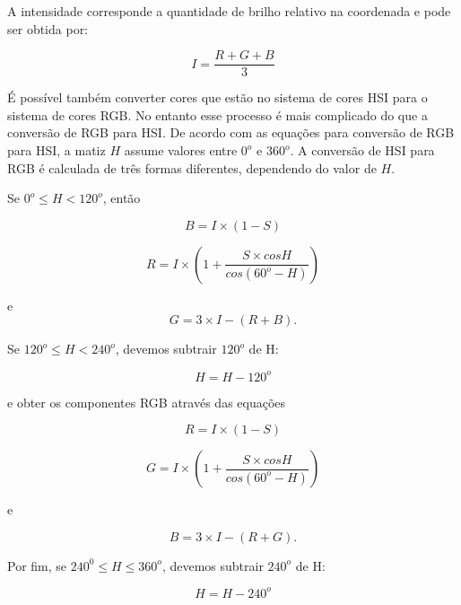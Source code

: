 \documentclass[	12pt, Times, openright, twoside, a4paper, english, brazil]{abntex2}
\begin{document}
A intensidade corresponde a quantidade de brilho relativo na coordenada e pode ser obtida por:

\begin{equation}
I = \frac{R+G+B}{3}
\end{equation}

É possível também converter cores que estão no sistema de cores HSI para o sistema de cores RGB. No entanto esse processo é mais complicado do que a conversão de RGB para HSI. De acordo com as equações para conversão de RGB para HSI, a matiz $H$ assume valores entre $0^o$ e $360^o$. A conversão de HSI para RGB é calculada de três formas diferentes, dependendo do valor de $H$. 

Se $0^o \leq H < 120^o$, então

\begin{equation}
B=I \times (1-S)
\end{equation}

\begin{equation}
R=I  \times \left( 1 +  \frac{S \times cosH}{cos (60^o - H)} \right)
\end{equation}

 e
\begin{equation}
G=3 \times I - (R+B).
\end{equation}

Se $120^o \leq H < 240^o$, devemos subtrair $120^o$ de H:

\begin{equation}
H=H-120^o
\end{equation}

e obter os componentes RGB através das equações

\begin{equation}
R=I \times (1-S)
\end{equation}

\begin{equation}
G=I  \times \left( 1 +  \frac{S \times cosH}{cos (60^o - H)} \right)
\end{equation}

e

\begin{equation}
B=3 \times I-(R+G).
\end{equation}

Por fim, se $240^0 \leq H \leq 360^o$, devemos subtrair $240^o$ de H:

\begin{equation}
H=H-240^o
\end{equation}
\end{document}
